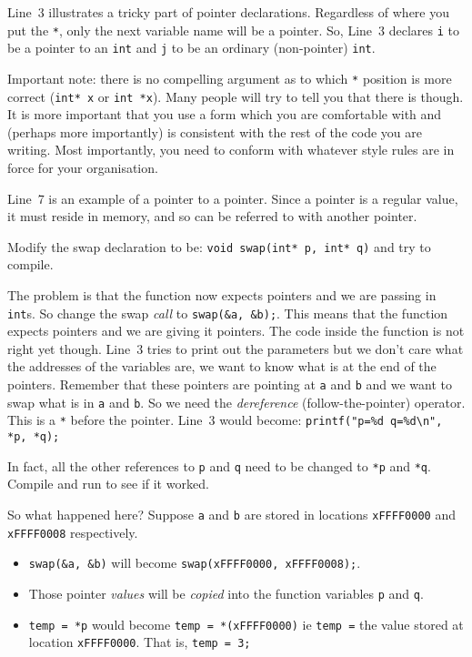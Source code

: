 Line~3 illustrates a tricky part of pointer declarations.
Regardless of where you put the \texttt{*}, only the next variable name will be a pointer.
So, Line~3 declares \texttt{i} to be a pointer to an \texttt{int} and \texttt{j} to be an ordinary (non-pointer) \texttt{int}.

Important note:
there is no compelling argument as to which \texttt{*} position is more correct (\texttt{int* x} or \texttt{int *x}).
Many people will try to tell you that there is though.
It is more important that you use a form which you are comfortable with and (perhaps more importantly) is consistent with 
the rest of the code you are writing.
Most importantly, you need to conform with whatever style rules are in force for your organisation.

Line~7 is an example of a pointer to a pointer.
Since a pointer is a regular value, it must reside in memory, and so can be referred to with another pointer.

Modify the swap declaration to be:
\lstinline!void swap(int* p, int* q)!
and try to compile.

The problem is that the function now expects pointers and we are passing in \texttt{int}s.
So change the swap \emph{call} to \lstinline!swap(&a, &b);!.
This means that the function expects pointers and we are giving it pointers.
The code inside the function is not right yet though.
Line~3 tries to print out the parameters but we don't care what the addresses of the variables are, we want to know what is
at the end of the pointers.
Remember that these pointers are pointing at \texttt{a} and \texttt{b} and we want to swap what is in \texttt{a} and \texttt{b}.
So we need the \emph{dereference} (follow-the-pointer) operator.
This is a \texttt{*} before the pointer.
Line~3 would become:
\lstinline!printf("p=%d q=%d\n", *p, *q);!

In fact, all the other references to \texttt{p} and \texttt{q} need to be changed to \texttt{*p} and \texttt{*q}.
Compile and run to see if it worked.

So what happened here?
Suppose \texttt{a} and \texttt{b} are stored in locations \lstinline{xFFFF0000} and \lstinline{xFFFF0008} respectively.
\begin{itemize}
 \item \lstinline{swap(&a, &b)} will become \lstinline{swap(xFFFF0000, xFFFF0008);}.
 \item Those pointer \emph{values} will be \emph{copied} into the function variables \texttt{p} and \texttt{q}.
 \item \lstinline!temp = *p! would become \lstinline!temp = *(xFFFF0000)! ie \texttt{temp =} the value stored at location 
 \lstinline!xFFFF0000!.  That is, \lstinline!temp = 3;!
\end{itemize}

